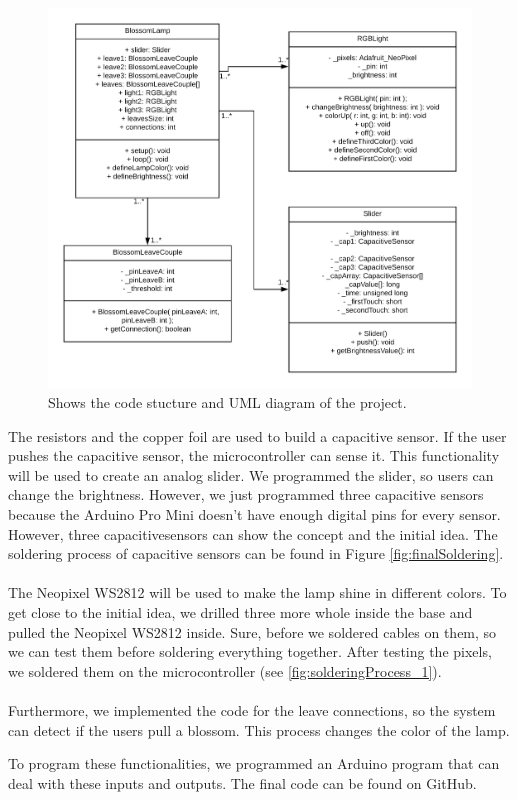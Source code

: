 \documentclass[04_projectProcess.tex]{subfiles}
\begin{document}
\begin{flushleft}
        \begin{figure}[H]
            \centering
            \includegraphics[width=0.8\linewidth]{images/programmingProcess/BlossomLamp_UML.png}
            \caption{Shows the code stucture and UML diagram of the project.}
            \label{fig:UMLDiagram}
        \end{figure}

        \noindent
        The resistors and the copper foil are used to build a capacitive sensor. \cite{Badger2019} 
        If the user pushes the capacitive sensor, the microcontroller can sense it. This functionality
        will be used to create an analog slider. We programmed the slider, so users can change the 
        brightness. However, we just programmed three capacitive sensors because the Arduino Pro Mini 
        doesn't have enough digital pins for every sensor. However, three capacitivesensors can show 
        the concept and the initial idea. The soldering process of capacitive sensors can be found in 
        Figure \ref{fig:finalSoldering}. \\~\\

        \noindent
        The Neopixel WS2812 will be used to make the lamp shine in different colors. \cite{Burgess2019} 
        To get close to the initial idea, we drilled three more whole inside the base and 
        pulled the Neopixel WS2812 inside. Sure, before we soldered cables on them, so we can 
        test them before soldering everything together. After testing the pixels, we soldered 
        them on the microcontroller (see \ref{fig:solderingProcess_1}).\\~\\

        \noindent
        Furthermore, we implemented the code for the leave connections, so the system can detect if 
        the users pull a blossom. This process changes the color of the lamp.

        \noindent
        To program these functionalities, we programmed an Arduino program that can deal with these inputs 
        and outputs. The final code can be found on GitHub. %
    \end{flushleft}
\end{document}
